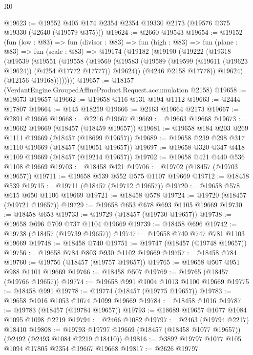 \begin{lexlean}{R0}
\begin{coremodule}
@19623 := @19552 @405 @174 @2354 @2354 @19330 @2173 (@19576 @375 @19330 (@2640 (@19579 @375)))
@19624 := @2660 @19543
@19654 := @19152
    (fun (low : @83) =>
    fun (divisor : @83) =>
    fun (high : @83) =>
    fun (plane : @83) =>
    fun (scale : @83) =>
    @19174
      (@19182
        (@19190
          (@19222
            (@19318
              (@19539
                (@19551
                  (@19558
                    (@19569
                      (@19583
                        (@19589 (@19599 (@19611 (@19623 @19624)) (@4254 @17772 @17777)) @19624))
                      (@4246 @2158 @17778))
                    @19624)
                  (@12156 @19168))))))))
@19657 := @18157 (VerdantEngine.GroupedAffineProduct.Request.accumulation @2158)
@19658 := @18673 @19657
@19662 := @19658 @116 @131 @194 @1112
@19663 := @2444 @17807
@19664 := @145 @18259
@19666 := @2163 @19664 @2173
@19667 := @2891 @19666
@19668 := @2216 @19667
@19669 := @19663 @19668
@19673 := @19662 @19669 (@18457 (@18459 @19657))
@19681 := @19658 @184 @203 @269 @1111 @19669 (@18457 (@18699 @19657))
@19689 := @19658 @239 @298 @317 @1110 @19669 (@18457 (@19051 @19657))
@19697 := @19658 @320 @347 @418 @1109 @19669 (@18457 (@19214 @19657))
@19702 := @19658 @421 @440 @536 @1108 @19669
@19703 := @18458 @421
@19706 := @19702 (@18457 (@19703 @19657))
@19711 := @19658 @539 @552 @575 @1107 @19669
@19712 := @18458 @539
@19715 := @19711 (@18457 (@19712 @19657))
@19720 := @19658 @578 @615 @650 @1106 @19669
@19721 := @18458 @578
@19724 := @19720 (@18457 (@19721 @19657))
@19729 := @19658 @653 @678 @693 @1105 @19669
@19730 := @18458 @653
@19733 := @19729 (@18457 (@19730 @19657))
@19738 := @19658 @696 @709 @737 @1104 @19669
@19739 := @18458 @696
@19742 := @19738 (@18457 (@19739 @19657))
@19747 := @19658 @740 @747 @781 @1103 @19669
@19748 := @18458 @740
@19751 := @19747 (@18457 (@19748 @19657))
@19756 := @19658 @784 @803 @930 @1102 @19669
@19757 := @18458 @784
@19760 := @19756 (@18457 (@19757 @19657))
@19765 := @19658 @507 @951 @988 @1101 @19669
@19766 := @18458 @507
@19769 := @19765 (@18457 (@19766 @19657))
@19774 := @19658 @991 @1004 @1013 @1100 @19669
@19775 := @18458 @991
@19778 := @19774 (@18457 (@19775 @19657))
@19783 := @19658 @1016 @1053 @1074 @1099 @19669
@19784 := @18458 @1016
@19787 := @19783 (@18457 (@19784 @19657))
@19793 := @18689 @19657 @1077 @1084 @1095 @1098 @2219
@19794 := @2466 @1082
@19797 := @2463 (@19794 @2217) @18410
@19808 := @19793 @19797 @19669 (@18457 (@18458 @1077 @19657)) (@2492 (@2493 @1084 @2219 @18410))
@19816 := @3892 @19797 @1077 @105 @1094 @17805 @2354 @19667 @19668
@19817 := @2626 @19797

\end{coremodule}
\end{lexlean}
